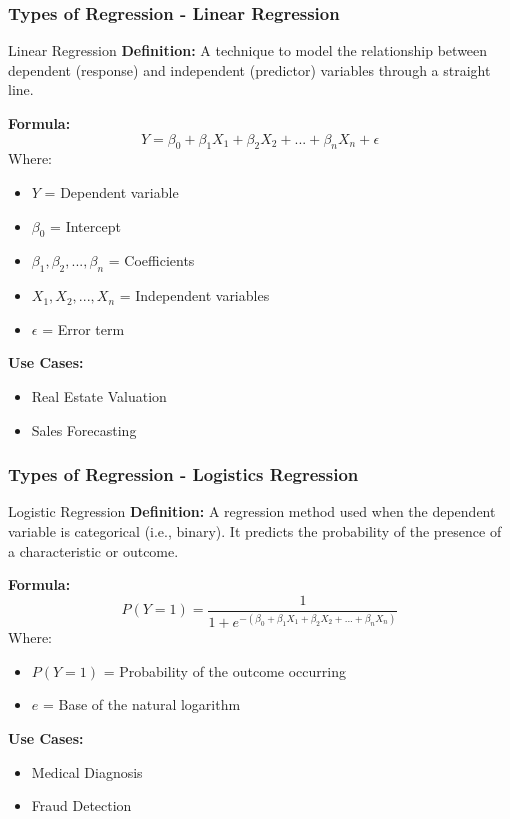\documentclass[aspectratio=169]{beamer}
\begin{document}
\begin{frame}[fragile]
    \frametitle{Types of Regression - Linear Regression}
    \begin{block}{Linear Regression}
        \textbf{Definition:} A technique to model the relationship between dependent (response) and independent (predictor) variables through a straight line.
        
        \textbf{Formula:}
        \begin{equation}
        Y = \beta_0 + \beta_1X_1 + \beta_2X_2 + ... + \beta_nX_n + \epsilon
        \end{equation}
        Where:
        \begin{itemize}
            \item \( Y \) = Dependent variable
            \item \( \beta_0 \) = Intercept
            \item \( \beta_1, \beta_2, ... , \beta_n \) = Coefficients
            \item \( X_1, X_2, ... , X_n \) = Independent variables
            \item \( \epsilon \) = Error term
        \end{itemize}
        
        \textbf{Use Cases:}
        \begin{itemize}
            \item Real Estate Valuation
            \item Sales Forecasting
        \end{itemize}
    \end{block}
\end{frame}

\begin{frame}[fragile]
    \frametitle{Types of Regression - Logistics Regression}
    \begin{block}{Logistic Regression}
        \textbf{Definition:} A regression method used when the dependent variable is categorical (i.e., binary). It predicts the probability of the presence of a characteristic or outcome.
        
        \textbf{Formula:}
        \begin{equation}
        P(Y=1) = \frac{1}{1 + e^{-(\beta_0 + \beta_1X_1 + \beta_2X_2 + ... + \beta_nX_n)}}
        \end{equation}
        Where:
        \begin{itemize}
            \item \( P(Y=1) \) = Probability of the outcome occurring
            \item \( e \) = Base of the natural logarithm
        \end{itemize}
        
        \textbf{Use Cases:}
        \begin{itemize}
            \item Medical Diagnosis
            \item Fraud Detection
        \end{itemize}
    \end{block}
\end{frame}
\end{document}
